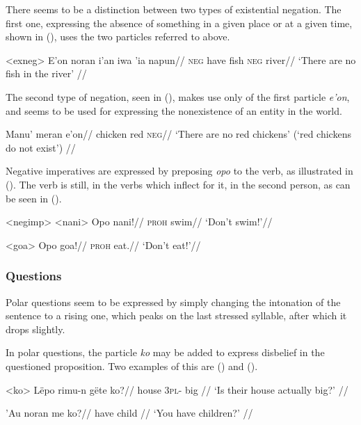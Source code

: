 \documentclass[../hewa_main-subfiles.tex]{subfiles}
\begin{document}
There seems to be a distinction between two types of existential negation. The first one, expressing the absence of something in a given place or at a given time, shown in (), uses the two particles referred to above.

\ex<exneg>
\begingl %
\gla E'on noran i'an iwa 'ia napun//
\glb \textsc{neg} have fish \textsc{neg} \Loc{} river//
\glft `There are no fish in the river' // 
\endgl
\xe

The second type of negation, seen in (), makes use only of the first particle \textit{e'on}, and seems to be used for expressing the nonexistence of an entity in the world.

\begingl %
\gla Manu' meran e'on//
\glb chicken red \textsc{neg}//
\glft `There are no red chickens' (`red chickens do not exist') // 
\endgl
\xe

Negative imperatives are expressed by preposing \textit{opo} to the verb, as illustrated in (). The verb is still, in the verbs which inflect for it, in the second person, as can be seen in ().

\pex<negimp> %
\a<nani> %
\begingl %
\gla Opo nani!//
\glb \textsc{proh} swim//
\glft `Don't swim!'//
\endgl

\a<goa> %
\begingl %
\gla Opo goa!//
\glb \textsc{proh} eat.\Second{}\Sg{}//
\glft `Don't eat!'// 
\endgl
\xe

\subsubsection{Questions}

Polar questions seem to be expressed by simply changing the intonation of the sentence to a rising one, which peaks on the last stressed syllable, after which it drops slightly. %

In polar questions, the particle \textit{ko} may be added to express disbelief in the questioned proposition. Two examples of this are () and ().

\ex<ko>
\begingl %
\gla Lëpo rimu-n gëte ko?//
\glb house 3\textsc{pl}-\Poss{} big \Q{}//
\glft `Is their house actually big?' // 
\endgl 
\xe

\begingl %
\gla 'Au noran me ko?//
\glb \Second{}\Sg{} have child \Q{}//
\glft `You have children?' // 
\endgl
\xe
\end{document}
